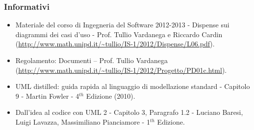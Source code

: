 {	\subsubsection{Informativi}
		\begin{itemize}
			\item Materiale del corso di Ingegneria del Software 2012-2013 - Dispense sui diagrammi dei casi d'uso - Prof. Tullio Vardanega e Riccardo Cardin
			      (\url {http://www.math.unipd.it/~tullio/IS-1/2012/Dispense/L06.pdf}).
			\item Regolamento: Documenti -- Prof. Tullio Vardanega (\url {http://www.math.unipd.it/~tullio/IS-1/2012/Progetto/PD01c.html}).
			\item UML distilled: guida rapida al linguaggio di modellazione standard - Capitolo 9 - Martin Fowler - 4$^{th}$ Edizione (2010).
			\item Dall'idea al codice con UML 2 - Capitolo 3, Paragrafo 1.2 - Luciano Baresi, Luigi Lavazza, Massimiliano Pianciamore - 1$^{th}$ Edizione.
		\end{itemize}
}